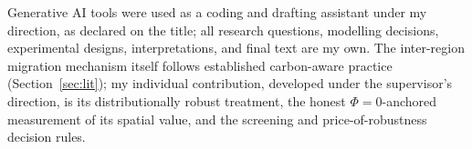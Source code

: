 \documentclass[10pt,twocolumn]{article}
\begin{document}
Generative AI tools were used as a coding and drafting assistant under my
direction, as declared on the title; all research questions, modelling
decisions, experimental designs, interpretations, and final text are my own. The
inter-region migration mechanism itself follows established carbon-aware practice
(Section~\ref{sec:lit}); my individual contribution, developed under the supervisor's
direction, is its distributionally robust treatment, the honest $\Phi=0$-anchored
measurement of its spatial value, and the screening and price-of-robustness decision
rules.
\end{document}
